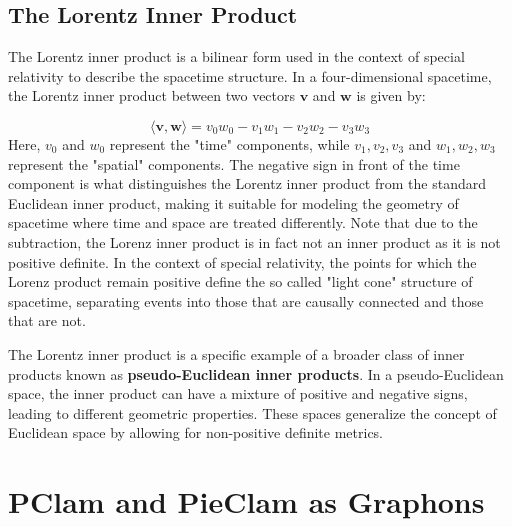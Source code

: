\documentclass{article}
\theoremstyle{plain}
\theoremstyle{definition}
\theoremstyle{remark}
\begin{document}
\subsection{The Lorentz Inner Product}
\label{The Lorentz Inner Product}

The Lorentz inner product is a bilinear form used in the context of special relativity to describe the spacetime structure. In a four-dimensional spacetime, the Lorentz inner product between two vectors \(\mathbf{v}\) and \(\mathbf{w}\) is given by:

\[
\langle \mathbf{v}, \mathbf{w} \rangle = v_0w_0 - v_1w_1 - v_2w_2 - v_3w_3
\]
Here, \(v_0\) and \(w_0\) represent the "time" components, while \(v_1, v_2, v_3\) and \(w_1, w_2, w_3\) represent the "spatial" components. The negative sign in front of the time component is what distinguishes the Lorentz inner product from the standard Euclidean inner product, making it suitable for modeling the geometry of spacetime where time and space are treated differently. Note that due to the subtraction, the Lorenz inner product is in fact not an inner product as it is not positive definite. In the context of special relativity, the points for which the Lorenz product remain positive define the so called "light cone" structure of spacetime, separating events into those that are causally connected and those that are not. 

The Lorentz inner product is a specific example of a broader class of inner products known as \textbf{pseudo-Euclidean inner products}. In a pseudo-Euclidean space, the inner product can have a mixture of positive and negative signs, leading to different geometric properties. These spaces generalize the concept of Euclidean space by allowing for non-positive definite metrics.

\section{PClam and PieClam as Graphons}
\end{document}
